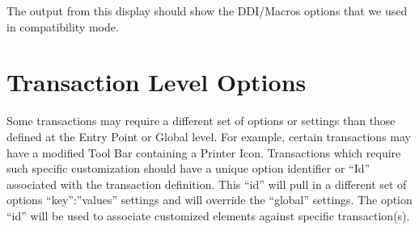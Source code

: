 \documentclass[letterpaper,10pt,english]{sphinxmanual}
\begin{document}

\begin{sphinxVerbatim}[commandchars=\\\{\}]
\end{sphinxVerbatim}

The output from this display should show the DDI/Macros options that we used in compatibility mode.

\begin{sphinxVerbatim}[commandchars=\\\{\}]
   
\end{sphinxVerbatim}


\ignorespaces 

\section{Transaction Level Options}
\label{\detokenize{Customization:transaction-level-options}}\label{\detokenize{Customization:index-4}}
Some transactions may require a different set of options or settings than those defined at the Entry Point or Global level. For example, certain transactions may have a modified Tool Bar containing a Printer Icon. Transactions which require such specific customization should have a unique option identifier or “Id” associated with the transaction definition. This “id” will pull in a different set of options “key”:”values” settings and will override the “global” settings. The option “id” will be used to associate customized elements against specific transaction(s).
\end{document}
